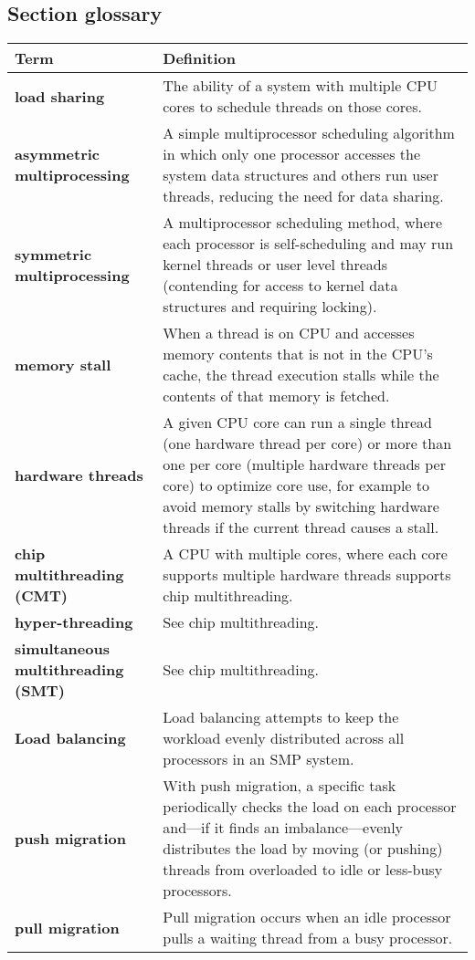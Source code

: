 \subsection*{Section glossary}
\centering
\begin{tabular}{>{\raggedright}p{} >{\raggedright\arraybackslash}p{}}
\toprule
\textbf{Term} & \textbf{Definition} \\
\midrule
\textbf{load sharing} & The ability of a system with multiple CPU cores to schedule threads on those cores. \\
\textbf{asymmetric multiprocessing} & A simple multiprocessor scheduling algorithm in which only one processor accesses the system data structures and others run user threads, reducing the need for data sharing. \\
\textbf{symmetric multiprocessing} & A multiprocessor scheduling method, where each processor is self-scheduling and may run kernel threads or user level threads (contending for access to kernel data structures and requiring locking). \\
\textbf{memory stall} & When a thread is on CPU and accesses memory contents that is not in the CPU's cache, the thread execution stalls while the contents of that memory is fetched. \\
\textbf{hardware threads} & A given CPU core can run a single thread (one hardware thread per core) or more than one per core (multiple hardware threads per core) to optimize core use, for example to avoid memory stalls by switching hardware threads if the current thread causes a stall. \\
\textbf{chip multithreading (CMT)} & A CPU with multiple cores, where each core supports multiple hardware threads supports chip multithreading. \\
\textbf{hyper-threading} & See chip multithreading. \\
\textbf{simultaneous multithreading (SMT)} & See chip multithreading. \\
\textbf{Load balancing} & Load balancing attempts to keep the workload evenly distributed across all processors in an SMP system. \\
\textbf{push migration} & With push migration, a specific task periodically checks the load on each processor and—if it finds an imbalance—evenly distributes the load by moving (or pushing) threads from overloaded to idle or less-busy processors. \\
\textbf{pull migration} & Pull migration occurs when an idle processor pulls a waiting thread from a busy processor. \\

\end{tabular}

